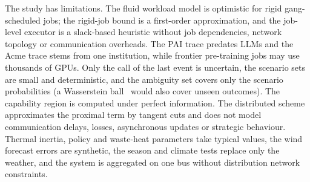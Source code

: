 The study has limitations. The fluid workload model is optimistic for rigid gang-scheduled jobs; the rigid-job bound is
a first-order approximation, and the job-level executor is a slack-based heuristic without job dependencies, network
topology or communication overheads. The PAI trace predates LLMs and the Acme trace stems from one institution, while
frontier pre-training jobs may use thousands of GPUs. Only the call of the last event is uncertain, the scenario sets are
small and deterministic, and the ambiguity set covers only the scenario probabilities (a Wasserstein
ball~\cite{esfahani2018} would also cover unseen outcomes). The capability region is computed under perfect information.
The distributed scheme approximates the proximal term by tangent cuts and does not model communication delays, losses,
asynchronous updates or strategic behaviour. Thermal inertia, policy and waste-heat parameters take typical values, the
wind forecast errors are synthetic, the season and climate tests replace only the weather, and the system is aggregated
on one bus without distribution network constraints.
